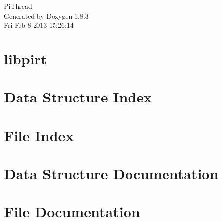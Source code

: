 \documentclass{book}
\begin{document}
\hypersetup{pageanchor=false,citecolor=blue}
\begin{titlepage}
\vspace*{7cm}
\begin{center}
{\Large Pi\-Thread }\\
\vspace*{1cm}
{\large Generated by Doxygen 1.8.3}\\
\vspace*{0.5cm}
{\small Fri Feb 8 2013 15:26:14}\\
\end{center}
\end{titlepage}
\clearemptydoublepage
{}
\tableofcontents
\clearemptydoublepage
{}
\hypersetup{pageanchor=true,citecolor=blue}
\chapter{libpirt}
\label{md_README}
\hypertarget{md_README}{}

\chapter{Data Structure Index}

\chapter{File Index}

\chapter{Data Structure Documentation}






















\chapter{File Documentation}


































\printindex
\end{document}
